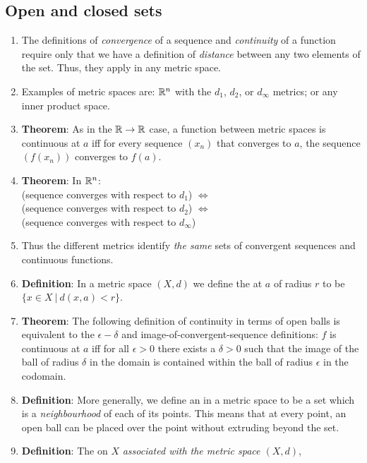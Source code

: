 \subsection{Open and closed sets}
\begin{enumerate}
\item The definitions of {\it convergence} of a sequence and {\it continuity} of a function require
  only that we have a definition of {\it distance} between any two elements of the set. Thus, they
  apply in any metric space.
\item Examples of metric spaces are: $\mathbb{R}^n$ with the $d_1$, $d_2$, or $d_\infty$ metrics; or any
  inner product space.
\item {\bf Theorem}: As in the $\mathbb{R} \to \mathbb{R}$ case, a function between metric spaces is continuous at
  $a$ iff for every sequence $(x_n)$ that converges to $a$, the sequence $(f(x_n))$ converges to
  $f(a)$.
\item {\bf Theorem}: In $\mathbb{R}^n$:\\
  (sequence converges with respect to $d_1$) $\iff$\\
  (sequence converges with respect to $d_2$) $\iff$\\
  (sequence converges with respect to $d_\infty$)
\item Thus the different metrics identify {\it the same} sets of convergent sequences and
  continuous functions.
\item {\bf Definition}: In a metric space $(X, d)$ we define the  at $a$ of radius
  $r$ to be $\{x \in X ~|~ d(x, a) < r\}$.
\item {\bf Theorem}: The following definition of continuity in terms of open balls is equivalent to
  the $\epsilon-\delta$ and image-of-convergent-sequence definitions: $f$ is continuous at $a$ iff
  for all $\epsilon > 0$ there exists a $\delta > 0$ such that the image of the ball of radius
  $\delta$ in the domain is contained within the ball of radius $\epsilon$ in the codomain.
\item {\bf Definition}: More generally, we define an  in a metric space to be a set
  which is a {\it neighbourhood} of each of its points. This means that at every point, an open
  ball can be placed over the point without extruding beyond the set.
\item {\bf Definition}: The  on $X$ {\it associated with the metric space $(X, d)$},

\end{enumerate}
